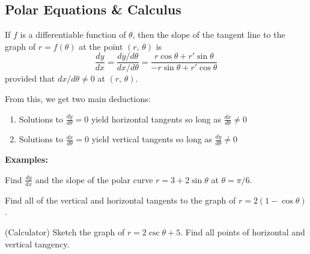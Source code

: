 \documentclass[addpoints, 12pt]{exam}
\begin{document}
\begin{questions}
\begin{minipage}{0.45\linewidth}
    \end{minipage}
\end{questions}
    
    


\newpage
{}
\subsection*{Polar Equations \& Calculus}

\begin{tcolorbox}[title= SLOPE IN POLAR FORM ,black,sharp corners,colback=white,colbacktitle=white,coltitle=black]

    If $f$ is a differentiable function of $\theta$, then the slope of the tangent line to the graph of $r=f(\theta)$ at the point $(r,\,\theta)$ is
    \[\frac{dy}{dx}=\frac{dy/d\theta}{dx/d\theta}=\frac{r\cos\theta+r'\sin\theta}{-r\sin\theta+r'\cos\theta}\]
    provided that $dx/d\theta\ne0$ at $(r,\,\theta)$.
    
\end{tcolorbox}
\vspace{.1cm}

From this, we get two main deductions:
\begin{enumerate}
    \item Solutions to $\displaystyle\frac{dy}{d\theta}=0$ yield horizontal tangents so long as $\displaystyle\frac{dx}{d\theta}\ne0$
    \item Solutions to $\displaystyle\frac{dx}{d\theta}=0$ yield vertical tangents so long as $\displaystyle\frac{dy}{d\theta}\ne0$
\end{enumerate}
\noindent\textbf{Examples:}
\begin{questions}
    \question Find $\frac{dy}{dx}$ and the slope of the polar curve $r=3+2\sin\theta$ at $\theta=\pi/6$.
    
    \question Find all of the vertical and horizontal tangents to the graph of $r=2(1-\cos\theta)$.
    
    \question (Calculator) Sketch the graph of $r=2\csc\theta+5$. Find all points of horizontal and vertical tangency.
\end{questions}
\end{document}

